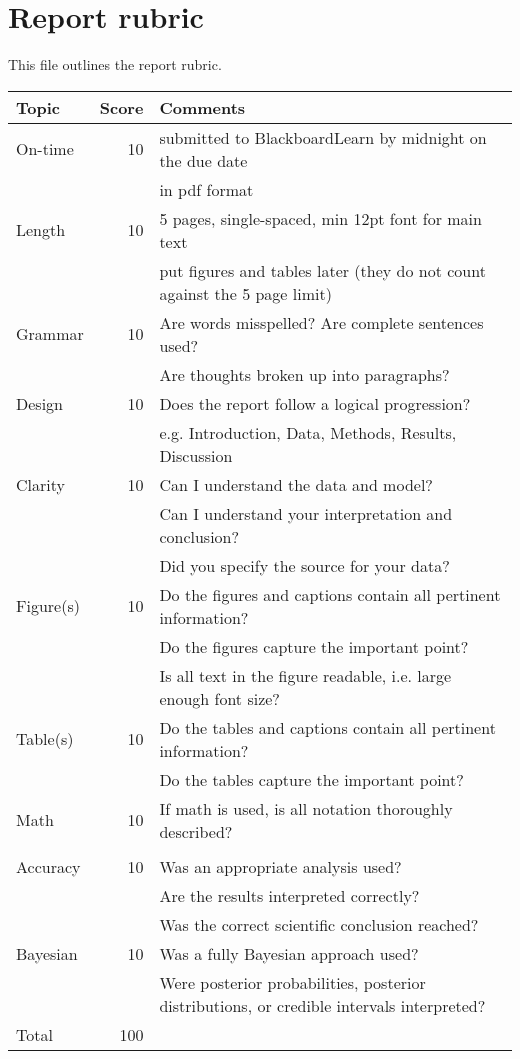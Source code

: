 \documentclass[10pt]{article}
\begin{document}
\chead[\fancyplain{} {}]   {\fancyplain{}{}}

\section*{Report rubric}

This file outlines the report rubric.

\begin{tabular}{|l|r|l|}
\hline
Topic & \multicolumn{1}{l|}{Score} & Comments \\
\hline
On-time   & 10 & submitted to BlackboardLearn by midnight on the due date \\
&& in pdf format \\
\hline
Length & 10 & 5 pages, single-spaced, min 12pt font for main text \\ 
&& put figures and tables later (they do not count against the 5 page limit) \\
\hline
Grammar & 10 & Are words misspelled? Are complete sentences used?\\
&& Are thoughts broken up into paragraphs? \\
\hline
Design & 10 & Does the report follow a logical progression? \\
&& e.g. Introduction, Data, Methods, Results, Discussion \\
\hline 
Clarity & 10 & Can I understand the data and model? \\
&& Can I understand your interpretation and conclusion? \\
&& Did you specify the source for your data? \\
\hline
Figure(s) & 10 & Do the figures and captions contain all pertinent information? \\
&& Do the figures capture the important point? \\
&& Is all text in the figure readable, i.e. large enough font size? \\
\hline
Table(s) & 10 & Do the tables and captions contain all pertinent information? \\
&& Do the tables capture the important point? \\
\hline
Math & 10 & If math is used, is all notation thoroughly described? \\ &&\\
\hline
Accuracy & 10 & Was an appropriate analysis used? \\
&& Are the results interpreted correctly? \\
&& Was the correct scientific conclusion reached? \\
\hline
Bayesian & 10 & Was a fully Bayesian approach used? \\
&& Were posterior probabilities, posterior distributions, or credible intervals interpreted? \\
\hline
Total &100 &\\
\hline
\end{tabular}
\end{document}
